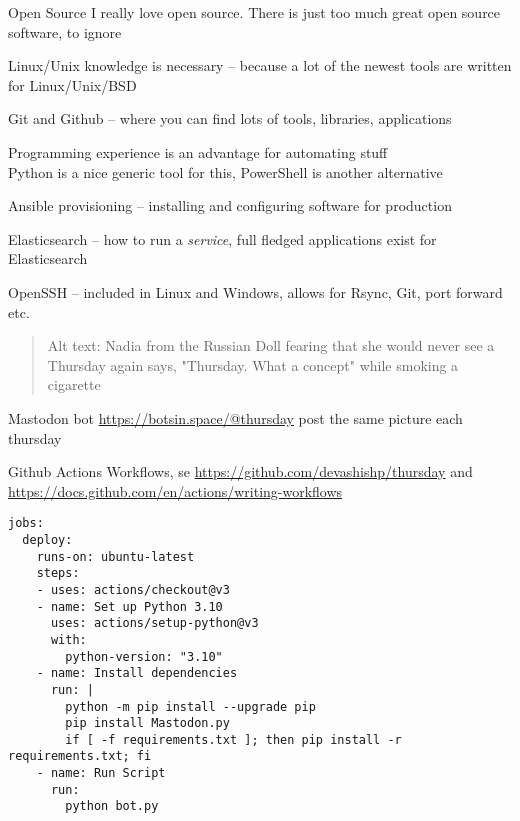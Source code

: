 \documentclass[Screen16to9,17pt]{foils}
\begin{document}
\begin{list2}
\item Open Source I really love open source. There is just too much great open source software, to ignore
\item Linux/Unix knowledge is necessary
-- because a lot of the newest tools are written for Linux/Unix/BSD
\item Git and Github -- where you can find lots of tools, libraries, applications
\item Programming experience is an advantage for automating stuff\\
Python is a nice generic tool for this, PowerShell is another alternative
\item Ansible provisioning -- installing and configuring software for production
\item Elasticsearch -- how to run a \emph{service}, full fledged applications exist for Elasticsearch
\item OpenSSH -- included in Linux and Windows, allows for Rsync, Git, port forward etc.
\end{list2}



\begin{quote}
Alt text: Nadia from the Russian Doll fearing that she would never see a Thursday again says, "Thursday. What a concept" while smoking a cigarette
\end{quote}

\begin{list2}
\item Mastodon bot \url{https://botsin.space/@thursday} post the same picture each thursday
\item Github Actions Workflows, se \url{https://github.com/devashishp/thursday} and \url{https://docs.github.com/en/actions/writing-workflows}

\end{list2}


\begin{verbatim}
jobs:
  deploy:
    runs-on: ubuntu-latest
    steps:
    - uses: actions/checkout@v3
    - name: Set up Python 3.10
      uses: actions/setup-python@v3
      with:
        python-version: "3.10"
    - name: Install dependencies
      run: |
        python -m pip install --upgrade pip
        pip install Mastodon.py
        if [ -f requirements.txt ]; then pip install -r requirements.txt; fi
    - name: Run Script
      run:
        python bot.py
\end{verbatim}
\end{document}
